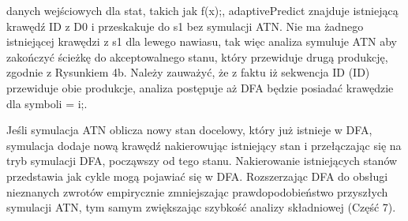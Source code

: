 danych wejściowych dla stat, takich jak f(x);, adaptivePredict znajduje
istniejącą krawędź ID z D0 i przeskakuje do s1 bez symulacji ATN.
Nie ma żadnego istniejącej krawędzi z s1 dla lewego nawiasu, tak więc analiza
symuluje ATN aby zakończyć ścieżkę do akceptowalnego stanu,
który przewiduje drugą produkcję, zgodnie z Rysunkiem 4b.
Należy zauważyć, że z faktu iż sekwencja ID (ID) przewiduje obie produkcje,
analiza postępuje aż DFA będzie posiadać krawędzie dla symboli = i;.
\par
Jeśli symulacja ATN oblicza nowy stan docelowy, który już istnieje w DFA,
symulacja dodaje nową krawędź nakierowując istniejący stan i przełączając się
na tryb symulacji DFA, począwszy od tego stanu. Nakierowanie istniejących
stanów przedstawia jak cykle mogą pojawiać się w DFA.
Rozszerzając DFA do obsługi nieznanych zwrotów empirycznie zmniejszając
prawdopodobieństwo przyszłych symulacji ATN, tym samym zwiększając szybkość
analizy składniowej (Część 7). 
